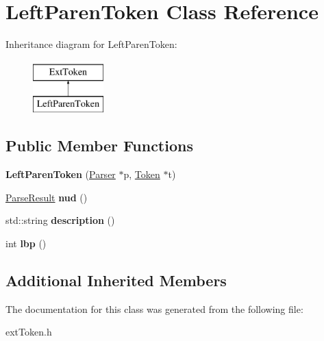 \hypertarget{classLeftParenToken}{\section{Left\-Paren\-Token Class Reference}
\label{classLeftParenToken}
}
Inheritance diagram for Left\-Paren\-Token\-:\begin{figure}[H]
\begin{center}
\leavevmode
\includegraphics[height=2.000000cm]{classLeftParenToken}
\end{center}
\end{figure}
\subsection*{Public Member Functions}
\begin{DoxyCompactItemize}
\item 
\hypertarget{classLeftParenToken_aecdc6faf48a1a7192ec55712f0264cba}{{\bfseries Left\-Paren\-Token} (\hyperlink{classParser}{Parser} $\ast$p, \hyperlink{classToken}{Token} $\ast$t)}\label{classLeftParenToken_aecdc6faf48a1a7192ec55712f0264cba}

\item 
\hypertarget{classLeftParenToken_a3cb3ae9ab2647e5534c85529d314f08b}{\hyperlink{classParseResult}{Parse\-Result} {\bfseries nud} ()}\label{classLeftParenToken_a3cb3ae9ab2647e5534c85529d314f08b}

\item 
\hypertarget{classLeftParenToken_a2df35684bd2081c3bdfe2357946917bc}{std\-::string {\bfseries description} ()}\label{classLeftParenToken_a2df35684bd2081c3bdfe2357946917bc}

\item 
\hypertarget{classLeftParenToken_afa1b94645278f097bb097d3b24445d14}{int {\bfseries lbp} ()}\label{classLeftParenToken_afa1b94645278f097bb097d3b24445d14}

\end{DoxyCompactItemize}
\subsection*{Additional Inherited Members}


The documentation for this class was generated from the following file\-:\begin{DoxyCompactItemize}
\item 
ext\-Token.\-h\end{DoxyCompactItemize}
